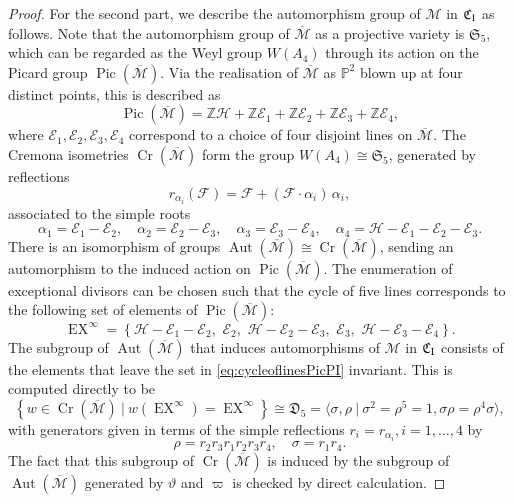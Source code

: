 \documentclass[a4paper,reqno]{amsart}
\numberwithin{equation}{section}
\newcommand{\Z}{\mathbb{Z}}
\newcommand{\p}{\mathbb{P}}
\newcommand{\E}{\mathcal{E}}
\newcommand{\F}{\mathcal{F}}
\newcommand{\h}{\mathcal{H}}
\newcommand{\Pic}{\operatorname{Pic}}
\DeclareMathOperator{\Aut}{Aut}
\numberwithin{equation}{section}
\begin{document}
\begin{proof}
For the second part, we describe the automorphism group of $\mathcal{M}$ in $\mathfrak{C}_{\rm{I}}$ as follows. 
Note that the automorphism group of $\overline{\mathcal{M}}$ as a projective variety is $\mathfrak{S}_5$, which can be regarded as the Weyl group $W(A_4)$ through its action on the Picard group $\Pic(\overline{\mathcal{M}})$. 
Via the realisation of $\overline{\mathcal{M}}$ as $\p^2$ blown up at four distinct points, this is described as
$$\Pic(\overline{\mathcal{M}}) = \Z \h +\Z\E_1 + \Z \E_2+ \Z \E_3 + \Z \E_4,$$
where $\E_1,\E_2,\E_3,\E_4$ correspond to a choice of four disjoint lines on $\overline{\mathcal{M}}$.
The Cremona isometries $\operatorname{Cr}(\overline{\mathcal{M}})$ form the group $W(A_4)\cong \mathfrak{S}_5$, generated by reflections 
            $$r_{\alpha_i} (\F) = \F + (\F\cdot \alpha_i)\,\alpha_i,$$
        associated to the simple roots 
$$ \alpha_1=\E_1-\E_2,\quad \alpha_2=\E_2-\E_3, \quad \alpha_3=\E_3-\E_4, \quad \alpha_4 = \h-\E_1-\E_2-\E_3.$$
There is an isomorphism of groups 
$\Aut(\overline{\mathcal{M}}) \cong \operatorname{Cr}(\overline{\mathcal{M}})$,
sending an automorphism to the induced action on $\Pic(\overline{\mathcal{M}})$.
The enumeration of exceptional divisors can be chosen such that the cycle of five lines corresponds to the following set of elements of $\Pic(\overline{\mathcal{M}})$:
\begin{equation} \label{eq:cycleoflinesPicPI}
    \operatorname{EX}^{\infty} = \left\{\h - \E_1 - \E_2, \,\, \E_2, \,\, \h - \E_2-\E_3, \,\, \E_3, \,\, \h-\E_3- \E_4\right\}.
\end{equation}
The subgroup of $\Aut(\overline{\mathcal{M}})$ that induces automorphisms of $\mathcal{M}$ in $\mathfrak{C}_{\rm{I}}$ consists of the elements that leave the set in \eqref{eq:cycleoflinesPicPI} invariant.
This is computed directly to be $$\left\{ w \in \operatorname{Cr}(\overline{\mathcal{M}}) ~|~ w (\operatorname{EX}^{\infty})= \operatorname{EX}^{\infty} \right\} \cong \mathfrak{D}_5 = \langle \sigma, \rho ~|~ \sigma^2=\rho^5=1, \sigma \rho=\rho^{4}\sigma\rangle,$$ 
with generators given in terms of the simple reflections $r_i = r_{\alpha_i}, i=1,\dots,4$ by 
$$\rho = r_2r_3r_1r_2r_3 r_4,\quad  \sigma = r_1r_4.$$
The fact that this subgroup of $\operatorname{Cr}(\overline{\mathcal{M}})$ is induced by the subgroup of $\operatorname{Aut}(\overline{\mathcal{M}})$ generated by $\vartheta$ and $\varpi$ is checked by direct calculation.
\end{proof}
\end{document}
